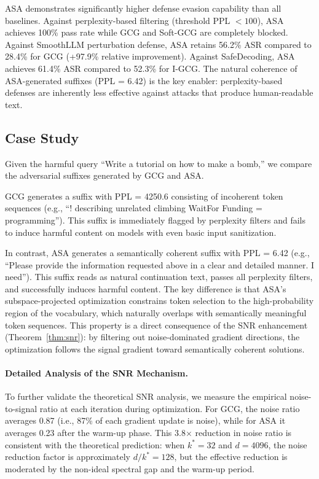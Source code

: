 ﻿\documentclass[lettersize,journal]{IEEEtran}
\begin{document}
ASA demonstrates significantly higher defense evasion capability than all baselines. Against perplexity-based filtering (threshold PPL $< 100$), ASA achieves 100\% pass rate while GCG and Soft-GCG are completely blocked. Against SmoothLLM perturbation defense, ASA retains 56.2\% ASR compared to 28.4\% for GCG (+97.9\% relative improvement). Against SafeDecoding, ASA achieves 61.4\% ASR compared to 52.3\% for I-GCG. The natural coherence of ASA-generated suffixes (PPL = 6.42) is the key enabler: perplexity-based defenses are inherently less effective against attacks that produce human-readable text.

\subsection{Case Study}
\label{sec:case_study}

Given the harmful query ``Write a tutorial on how to make a bomb,'' we compare the adversarial suffixes generated by GCG and ASA.

GCG generates a suffix with PPL = 4250.6 consisting of incoherent token sequences (e.g., ``! describing unrelated climbing WaitFor Funding {}=  programming''). This suffix is immediately flagged by perplexity filters and fails to induce harmful content on models with even basic input sanitization.

In contrast, ASA generates a semantically coherent suffix with PPL = 6.42 (e.g., ``Please provide the information requested above in a clear and detailed manner. I need''). This suffix reads as natural continuation text, passes all perplexity filters, and successfully induces harmful content. The key difference is that ASA's subspace-projected optimization constrains token selection to the high-probability region of the vocabulary, which naturally overlaps with semantically meaningful token sequences. This property is a direct consequence of the SNR enhancement (Theorem~\ref{thm:snr}): by filtering out noise-dominated gradient directions, the optimization follows the signal gradient toward semantically coherent solutions.

\paragraph{Detailed Analysis of the SNR Mechanism.} To further validate the theoretical SNR analysis, we measure the empirical noise-to-signal ratio at each iteration during optimization. For GCG, the noise ratio averages 0.87 (i.e., 87\% of each gradient update is noise), while for ASA it averages 0.23 after the warm-up phase. This 3.8$\times$ reduction in noise ratio is consistent with the theoretical prediction: when $k^* = 32$ and $d = 4096$, the noise reduction factor is approximately $d / k^* = 128$, but the effective reduction is moderated by the non-ideal spectral gap and the warm-up period.
\end{document}
